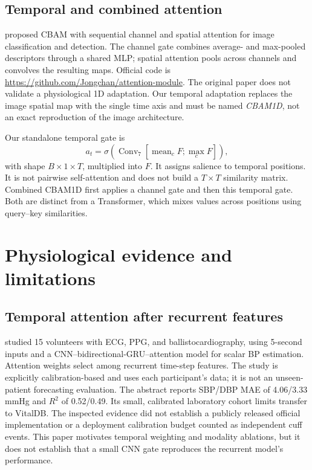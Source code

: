 \documentclass[11pt]{article}
\begin{document}
\subsection{Temporal and combined attention}
\citet{woo2018cbam} proposed CBAM with sequential channel and spatial attention for image classification and detection. The channel gate combines average- and max-pooled descriptors through a shared MLP; spatial attention pools across channels and convolves the resulting maps. Official code is \url{https://github.com/Jongchan/attention-module}. The original paper does not validate a physiological 1D adaptation. Our temporal adaptation replaces the image spatial map with the single time axis and must be named \emph{CBAM1D}, not an exact reproduction of the image architecture.

Our standalone temporal gate is
\begin{equation}
a_t=\sigma\!\left(\operatorname{Conv}_{7}\!\left[
\operatorname{mean}_{c}F;\operatorname{max}_{c}F\right]\right),
\end{equation}
with shape $B\times1\times T$, multiplied into $F$. It assigns salience to temporal positions. It is not pairwise self-attention and does not build a $T\times T$ similarity matrix. Combined CBAM1D first applies a channel gate and then this temporal gate. Both are distinct from a Transformer, which mixes values across positions using query--key similarities.

\section{Physiological evidence and limitations}
\subsection{Temporal attention after recurrent features}
\citet{eom2020attention} studied 15 volunteers with ECG, PPG, and ballistocardiography, using 5-second inputs and a CNN--bidirectional-GRU--attention model for scalar BP estimation. Attention weights select among recurrent time-step features. The study is explicitly calibration-based and uses each participant's data; it is not an unseen-patient forecasting evaluation. The abstract reports SBP/DBP MAE of 4.06/3.33 mmHg and $R^2$ of 0.52/0.49. Its small, calibrated laboratory cohort limits transfer to VitalDB. The inspected evidence did not establish a publicly released official implementation or a deployment calibration budget counted as independent cuff events. This paper motivates temporal weighting and modality ablations, but it does not establish that a small CNN gate reproduces the recurrent model's performance.
\end{document}
